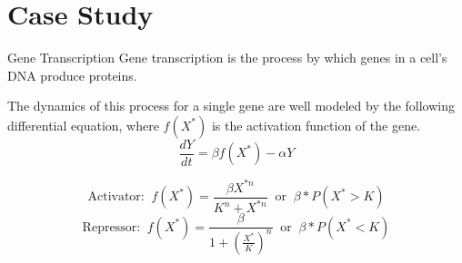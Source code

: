 \documentclass{beamer}
\begin{document}
\section{Case Study}

\begin{frame}{Gene Transcription}
    Gene transcription is the process by which genes in a cell’s DNA produce proteins.

    \vspace*{0.125in}
    The dynamics of this process for a single gene are well modeled by the following differential equation, where $f(X^*)$ is the activation function of the gene.
    $$\frac{dY}{dt}=\beta f(X^*) - \alpha Y$$

    $$\text{Activator: } \ f(X^*)=\frac{\beta X^{*n}}{K^n + X^{*n}} \ \text{ or } \ \beta * P(X^* > K)$$
    $$\text{Repressor: } \ f(X^*)=\frac{\beta}{1 + \left(\frac{X^*}{K}\right)^n} \ \text{ or } \ \beta * P(X^* < K)$$
\end{frame}
\end{document}
